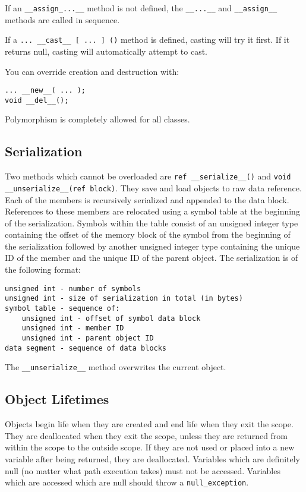 \documentclass[10pt,a4paper]{article}
\begin{document}
If an \verb|__assign_...__| method is not defined, the \verb|__...__| and \verb|__assign__| methods are called in sequence.

If a \verb|... __cast__ [ ... ] ()| method is defined, casting will try it first. If it returns null, casting will automatically attempt to cast.

You can override creation and destruction with:
\begin{verbatim}
... __new__( ... );
void __del__();
\end{verbatim}

Polymorphism is completely allowed for all classes.

\subsection{Serialization}
Two methods which cannot be overloaded are \verb|ref __serialize__()| and \linebreak
\verb|void __unserialize__(ref block)|. They save and load objects to raw data reference. Each of the members is recursively serialized and appended to the data block. References to these members are relocated using a symbol table at the beginning of the serialization. Symbols within the table consist of an unsigned integer type containing the offset of the memory block of the symbol from the beginning of the serialization followed by another unsigned integer type containing the unique ID of the member and the unique ID of the parent object. The serialization is of the following format:
\begin{verbatim}
unsigned int - number of symbols
unsigned int - size of serialization in total (in bytes)
symbol table - sequence of:
    unsigned int - offset of symbol data block
    unsigned int - member ID
    unsigned int - parent object ID
data segment - sequence of data blocks
\end{verbatim}

The \verb|__unserialize__| method overwrites the current object.

\subsection{Object Lifetimes}
Objects begin life when they are created and end life when they exit the scope. They are deallocated when they exit the scope, unless they are returned from within the scope to the outside scope. If they are not used or placed into a new variable after being returned, they are deallocated. Variables which are definitely null (no matter what path execution takes) must not be accessed. Variables which are accessed which are null should throw a \verb|null_exception|.
\end{document}
